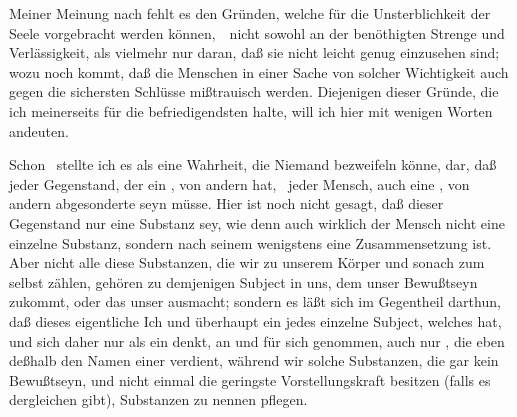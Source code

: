 Meiner Meinung nach fehlt es den Gründen, welche für die Unsterblichkeit der Seele vorgebracht werden können,~\ nicht sowohl an der benöthigten Strenge und Verlässigkeit, als vielmehr nur daran, daß sie nicht leicht genug einzusehen sind; wozu noch kommt, daß die Menschen in einer Sache von solcher Wichtigkeit auch gegen die sichersten Schlüsse mißtrauisch werden. Diejenigen dieser Gründe, die ich meinerseits für die befriedigendsten halte, will ich hier mit wenigen Worten andeuten.
\begin{aufza} 
\item Schon \ stellte ich es als eine Wahrheit, die Niemand bezweifeln könne, dar, daß jeder Gegenstand, der ein , von andern  hat, \zB\ jeder Mensch, auch eine , von andern abgesonderte  seyn müsse. Hier ist noch nicht gesagt, daß dieser Gegenstand nur eine  Substanz sey, wie denn auch wirklich der Mensch nicht eine einzelne Substanz, sondern nach seinem  wenigstens eine Zusammensetzung  ist. Aber nicht alle diese Substanzen, die wir zu unserem Körper und sonach zum  selbst zählen, gehören zu demjenigen Subject in uns, dem unser Bewußtseyn zukommt, oder das unser  ausmacht; sondern es läßt sich im Gegentheil darthun, daß dieses eigentliche Ich und überhaupt ein jedes einzelne Subject, welches  hat, und sich daher nur als ein  denkt, an und für sich genommen, auch nur , die eben deßhalb den Namen einer  verdient, während wir solche Substanzen, die gar kein Bewußtseyn, und nicht einmal die geringste Vorstellungskraft besitzen (falls es dergleichen gibt),  Substanzen zu nennen pflegen.

\end{aufza}
